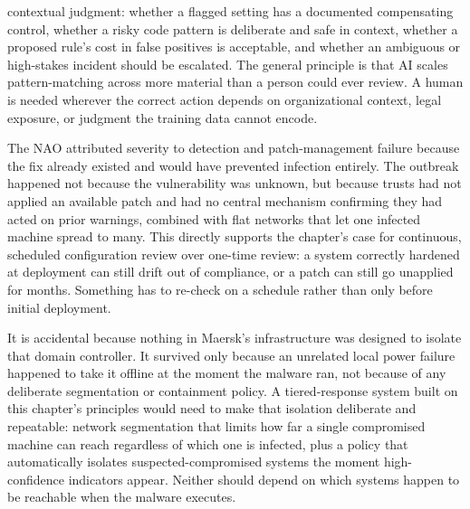\begin{answerkey}
contextual judgment: whether a flagged setting has a documented compensating control, whether a
risky code pattern is deliberate and safe in context, whether a proposed rule's cost in false
positives is acceptable, and whether an ambiguous or high-stakes incident should be escalated. The
general principle is that AI scales pattern-matching across more material than a person could ever
review. A human is needed wherever the correct action depends on organizational context, legal
exposure, or judgment the training data cannot encode.
\item The NAO attributed severity to detection and patch-management failure because the fix
already existed and would have prevented infection entirely. The outbreak happened not because the
vulnerability was unknown, but because trusts had not applied an available patch and had no
central mechanism confirming they had acted on prior warnings, combined with flat networks that
let one infected machine spread to many. This directly supports the chapter's case for continuous,
scheduled configuration review over one-time review: a system correctly hardened at deployment can
still drift out of compliance, or a patch can still go unapplied for months. Something has to
re-check on a schedule rather than only before initial deployment.
\item It is accidental because nothing in Maersk's infrastructure was designed to isolate that
domain controller. It survived only because an unrelated local power failure happened to take it
offline at the moment the malware ran, not because of any deliberate segmentation or containment
policy. A tiered-response system built on this chapter's principles would need to make that
isolation deliberate and repeatable: network segmentation that limits how far a single compromised
machine can reach regardless of which one is infected, plus a policy that automatically isolates
suspected-compromised systems the moment high-confidence indicators appear. Neither should depend
on which systems happen to be reachable when the malware executes.
\end{answerkey}

